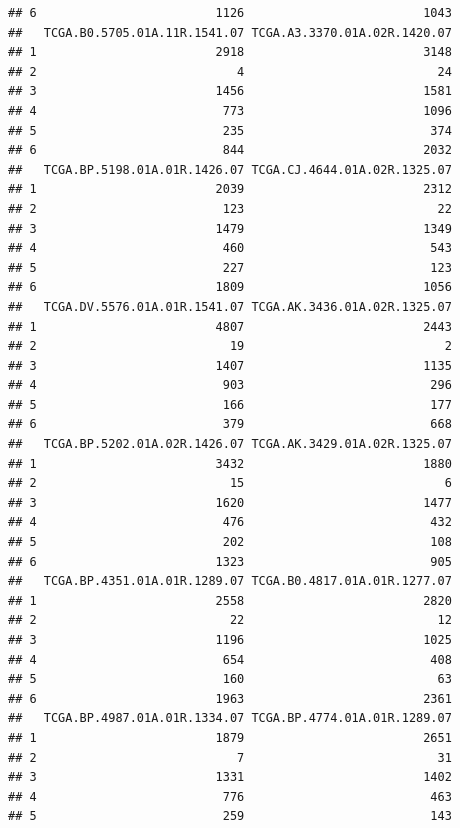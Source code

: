 \documentclass[
]{article}
\begin{document}
\begin{verbatim}
## 6                         1126                         1043
##   TCGA.B0.5705.01A.11R.1541.07 TCGA.A3.3370.01A.02R.1420.07
## 1                         2918                         3148
## 2                            4                           24
## 3                         1456                         1581
## 4                          773                         1096
## 5                          235                          374
## 6                          844                         2032
##   TCGA.BP.5198.01A.01R.1426.07 TCGA.CJ.4644.01A.02R.1325.07
## 1                         2039                         2312
## 2                          123                           22
## 3                         1479                         1349
## 4                          460                          543
## 5                          227                          123
## 6                         1809                         1056
##   TCGA.DV.5576.01A.01R.1541.07 TCGA.AK.3436.01A.02R.1325.07
## 1                         4807                         2443
## 2                           19                            2
## 3                         1407                         1135
## 4                          903                          296
## 5                          166                          177
## 6                          379                          668
##   TCGA.BP.5202.01A.02R.1426.07 TCGA.AK.3429.01A.02R.1325.07
## 1                         3432                         1880
## 2                           15                            6
## 3                         1620                         1477
## 4                          476                          432
## 5                          202                          108
## 6                         1323                          905
##   TCGA.BP.4351.01A.01R.1289.07 TCGA.B0.4817.01A.01R.1277.07
## 1                         2558                         2820
## 2                           22                           12
## 3                         1196                         1025
## 4                          654                          408
## 5                          160                           63
## 6                         1963                         2361
##   TCGA.BP.4987.01A.01R.1334.07 TCGA.BP.4774.01A.01R.1289.07
## 1                         1879                         2651
## 2                            7                           31
## 3                         1331                         1402
## 4                          776                          463
## 5                          259                          143

\end{verbatim}
\end{document}

